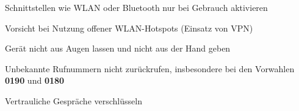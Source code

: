 \item Schnittstellen wie WLAN oder Bluetooth nur bei Gebrauch aktivieren
\item Vorsicht bei Nutzung offener WLAN-Hotspots (Einsatz von VPN)
\item Gerät nicht aus Augen lassen und nicht aus der Hand geben
\item Unbekannte Rufnummern nicht zurückrufen, insbesondere bei den Vorwahlen \textbf{0190} und \textbf{0180}
\item Vertrauliche Gespräche verschlüsseln